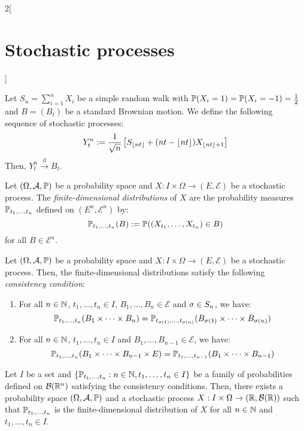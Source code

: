 \documentclass[../../../main_math.tex]{subfiles}
\begin{document}
\begin{multicols}{2}[\section{Stochastic processes}]
\begin{sproof}
\end{sproof}
\begin{proposition}
  Let $S_n=\sum_{i=1}^n X_i$ be a simple random walk with $\Prob(X_i=1)=\Prob(X_i=-1)=\frac{1}{2}$ and $B=(B_t)$ be a standard Brownian motion. We define the following sequence of stochastic processes:
  $$
    {Y_t^n}:=\frac{1}{\sqrt{n}}\left[S_{\floor{nt}}+(nt-\floor{nt})X_{\floor{nt}+1}\right]
  $$ 
  Then, $Y_t^n\overset{\mathrm{d}}{\longrightarrow} B_t$.
\end{proposition}
\begin{definition}
  Let $(\Omega, \mathcal{A}, \Prob)$ be a probability space and $X: I\times\Omega\rightarrow (E,\mathcal{E})$ be a stochastic process. The \emph{finite-dimensional distributions} of $X$ are the probability measures $\Prob_{t_1,\dots,t_n}$ defined on $(E^n,\mathcal{E}^n)$ by:
  $$
    \Prob_{t_1,\dots,t_n}(B):=\Prob((X_{t_1},\dots,X_{t_n})\in B)
  $$
  for all $B\in\mathcal{E}^n$.
\end{definition}
\begin{lemma}
  Let $(\Omega, \mathcal{A}, \Prob)$ be a probability space and $X: I\times\Omega\rightarrow (E,\mathcal{E})$ be a stochastic process. Then, the finite-dimensional distributions satisfy the following \emph{consistency condition}:
  \begin{enumerate}
    \item For all $n\in\NN$, $t_1,\dots,t_n\in I$, $B_1,\dots,B_n\in\mathcal{E}$ and $\sigma\in\S_n$, we have: 
    $$
      \Prob_{t_1,\dots,t_n}(B_1\times\dots\times B_n)=\Prob_{t_{\sigma(1)},\dots,t_{\sigma(n)}}(B_{\sigma(1)}\times\dots\times B_{\sigma(n)})
    $$
    \item  For all $n\in\NN$, $t_1,\dots,t_n\in I$ and $B_1,\dots,B_{n-1}\in\mathcal{E}$, we have: 
    $$
      \Prob_{t_1,\dots,t_n}(B_1\times\dots\times B_{n-1}\times E)=\Prob_{t_1,\dots,t_{n-1}}(B_1\times\dots\times B_{n-1})
    $$
  \end{enumerate}
\end{lemma}
\begin{theorem}
  Let $I$ be a set and $\{\Prob_{t_1,\dots,t_n}:n\in\NN,t_1,\ldots,t_n\in I\}$ be a family of probabilities defined on $\mathcal{B}(\RR^n)$ satisfying the consistency conditions. Then, there exists a probability space $(\Omega, \mathcal{A}, \Prob)$ and a stochastic process $X: I\times\Omega\rightarrow (\RR,\mathcal{B}(\RR))$ such that $\Prob_{t_1,\dots,t_n}$ is the finite-dimensional distribution of $X$ for all $n\in\NN$ and $t_1,\dots,t_n\in I$. 
\end{theorem}
\end{multicols}
\end{document}
